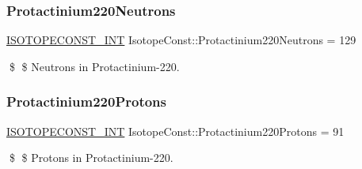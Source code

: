 \subsubsection{\texorpdfstring{Protactinium220\+Neutrons}{Protactinium220Neutrons}}
{\footnotesize\ttfamily \mbox{\hyperlink{group___isotope_const-_macros_ga5f18360b3e99483a35c32d789e62621c}{I\+S\+O\+T\+O\+P\+E\+C\+O\+N\+S\+T\+\_\+\+I\+NT}} Isotope\+Const\+::\+Protactinium220\+Neutrons = 129}

\$ \$ Neutrons in Protactinium-\/220. \mbox{\label{group___isotope_const-_protactinium-_pa220_ga5d95e3497ab9daedd2dfd6dd506f839e}} 
\subsubsection{\texorpdfstring{Protactinium220\+Protons}{Protactinium220Protons}}
{\footnotesize\ttfamily \mbox{\hyperlink{group___isotope_const-_macros_ga5f18360b3e99483a35c32d789e62621c}{I\+S\+O\+T\+O\+P\+E\+C\+O\+N\+S\+T\+\_\+\+I\+NT}} Isotope\+Const\+::\+Protactinium220\+Protons = 91}

\$ \$ Protons in Protactinium-\/220. 